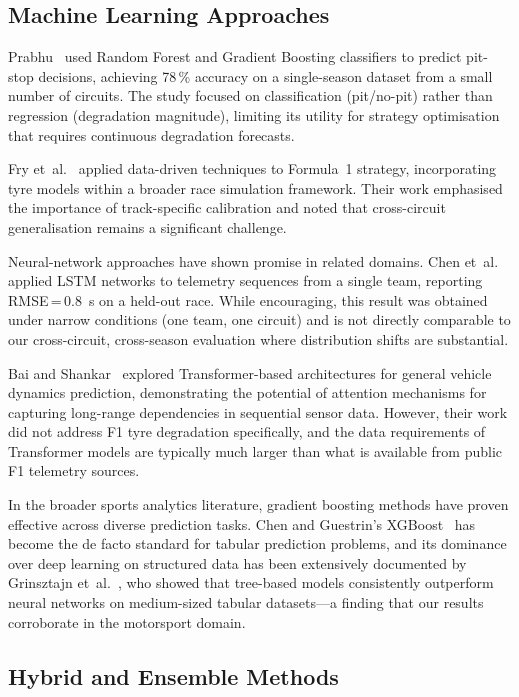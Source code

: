 \documentclass[journal,twoside]{IEEEtran}
\begin{document}
\subsection{Machine Learning Approaches}

Prabhu~\cite{prabhu2023machine} used Random Forest and Gradient
Boosting classifiers to predict pit-stop decisions, achieving 78\,\%
accuracy on a single-season dataset from a small number of circuits.
The study focused on classification (pit/no-pit) rather than
regression (degradation magnitude), limiting its utility for strategy
optimisation that requires continuous degradation forecasts.

Fry et~al.~\cite{fry2021data} applied data-driven techniques to
Formula~1 strategy, incorporating tyre models within a broader race
simulation framework.  Their work emphasised the importance of
track-specific calibration and noted that cross-circuit generalisation
remains a significant challenge.

Neural-network approaches have shown promise in related domains.
Chen et~al.~\cite{lstm_deg2022} applied LSTM networks to telemetry
sequences from a single team, reporting RMSE\,=\,\SI{0.8}{\second} on
a held-out race.  While encouraging, this result was obtained under
narrow conditions (one team, one circuit) and is not directly
comparable to our cross-circuit, cross-season evaluation where
distribution shifts are substantial.

Bai and Shankar~\cite{bai2023transformer} explored Transformer-based
architectures for general vehicle dynamics prediction, demonstrating
the potential of attention mechanisms for capturing long-range
dependencies in sequential sensor data.  However, their work did not
address F1 tyre degradation specifically, and the data requirements of
Transformer models are typically much larger than what is available from
public F1 telemetry sources.

In the broader sports analytics literature, gradient boosting methods
have proven effective across diverse prediction tasks.  Chen and
Guestrin's XGBoost~\cite{chen2016xgboost} has become the de facto
standard for tabular prediction problems, and its dominance over deep
learning on structured data has been extensively documented by
Grinsztajn et~al.~\cite{grinsztajn2022tree}, who showed that tree-based
models consistently outperform neural networks on medium-sized tabular
datasets---a finding that our results corroborate in the motorsport
domain.

\subsection{Hybrid and Ensemble Methods}
\end{document}
